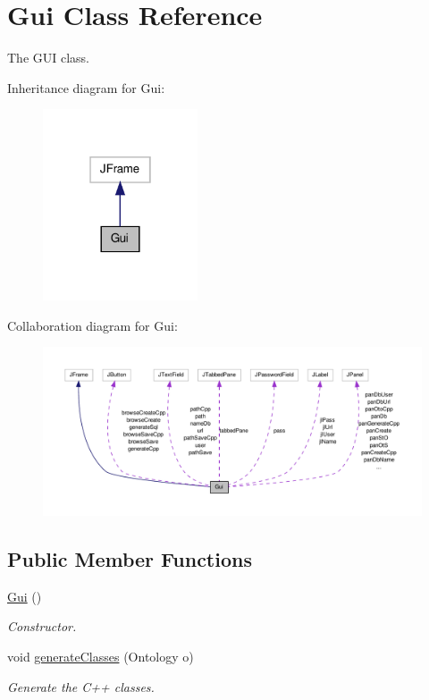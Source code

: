 \hypertarget{class_gui}{
\section{Gui Class Reference}
\label{class_gui}
}


The GUI class.  




Inheritance diagram for Gui:\nopagebreak
\begin{figure}[H]
\begin{center}
\leavevmode
\includegraphics[width=130pt]{class_gui__inherit__graph}
\end{center}
\end{figure}


Collaboration diagram for Gui:\nopagebreak
\begin{figure}[H]
\begin{center}
\leavevmode
\includegraphics[width=400pt]{class_gui__coll__graph}
\end{center}
\end{figure}
\subsection*{Public Member Functions}
\begin{DoxyCompactItemize}
\item 
\hyperlink{class_gui_aa803177c18d790a882ffcbae64b7ebbf}{Gui} ()
\begin{DoxyCompactList}\small\item\em Constructor. \end{DoxyCompactList}\item 
void \hyperlink{class_gui_a8625b72e14c540c8aaef92127a14fca7}{generateClasses} (Ontology o)
\begin{DoxyCompactList}\small\item\em Generate the C++ classes. \end{DoxyCompactList}\end{DoxyCompactItemize}
